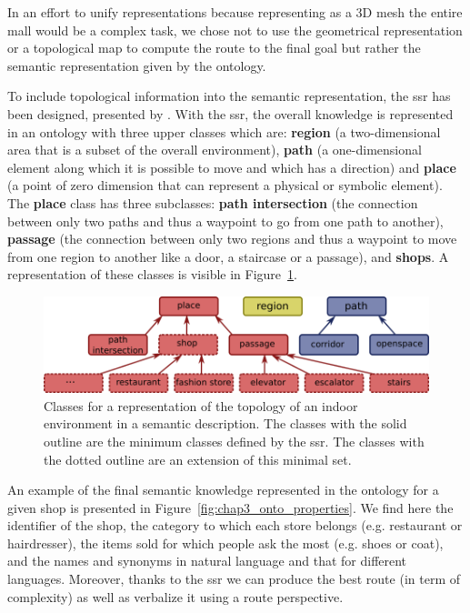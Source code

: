 \documentclass[a4paper,11pt,twoside]{StyleThese}
\begin{document}
In an effort to unify representations because representing as a 3D mesh the entire mall would be a complex task, we chose not to use the geometrical representation or a topological map to compute the route to the final goal but rather the semantic representation given by the ontology.

To include topological information into the semantic representation, the \acrfull{ssr} has been designed, presented by \cite{sarthou_2019_semantic}. With the \acrshort{ssr}, the overall knowledge is represented in an ontology with three upper classes which are: \textbf{region} (\ie a two-dimensional area that is a subset of the overall environment), \textbf{path} (\ie a one-dimensional element along which it is possible to move and which has a direction) and \textbf{place} (\ie a point of zero dimension that can represent a physical or symbolic element). The \textbf{place} class has three subclasses: \textbf{path intersection} (\ie the connection between only two paths and thus a waypoint to go from one path to another), \textbf{passage} (\ie the connection between only two regions and thus a waypoint to move from one region to another like a door, a staircase or a passage), and \textbf{shops}. A representation of these classes is visible in Figure~\ref{fig:chap3_onto_classes}.

\begin{figure}[!ht]
	\centering
	\includegraphics[scale=0.45]{figures/chapter3/classes.png}
	\caption{\label{fig:chap3_onto_classes} Classes for a representation of the topology of an indoor environment in a semantic description. The classes with the solid outline are the minimum classes defined by the \acrshort{ssr}. The classes with the dotted outline are an extension of this minimal set.}
\end{figure}

An example of the final semantic knowledge represented in the ontology for a given shop is presented in Figure~\ref{fig:chap3_onto_properties}. We find here the identifier of the shop, the category to which each store belongs (e.g. restaurant or hairdresser), the items sold for which people ask the most (e.g. shoes or coat), and the names and synonyms in natural language and that for different languages.
Moreover, thanks to the \acrshort{ssr} we can produce the best route (in term of complexity) as well as verbalize it using a route perspective.
\end{document}

